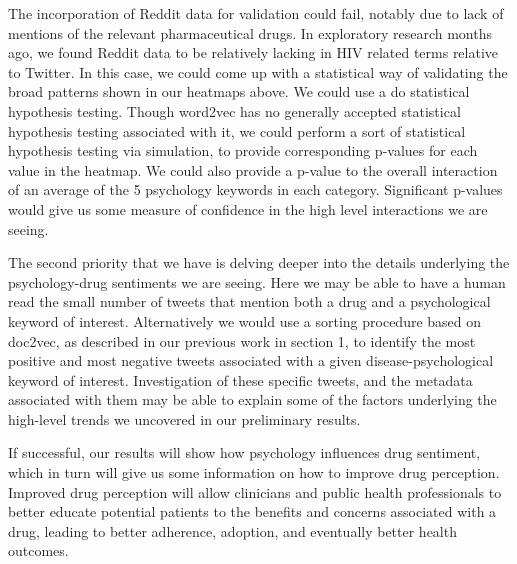 The incorporation of Reddit data for validation could fail, notably due to lack of mentions of the relevant pharmaceutical drugs. In exploratory research months ago, we found Reddit data to be relatively lacking in HIV related terms relative to Twitter. In this case, we could come up with a statistical way of validating the broad patterns shown in our heatmaps above. We could use a do statistical hypothesis testing. Though word2vec has no generally accepted statistical hypothesis testing associated with it, we could perform a sort of statistical hypothesis testing via simulation, to provide corresponding p-values for each value in the heatmap. We could also provide a p-value to the overall interaction of an average of the 5 psychology keywords in each category. Significant p-values would give us some measure of confidence in the high level interactions we are seeing.

The second priority that we have is delving deeper into the details underlying the psychology-drug sentiments we are seeing. Here we may be able to have a human read the small number of tweets that mention both a drug and a psychological keyword of interest. Alternatively we would use a sorting procedure based on doc2vec, as described in our previous work in section 1, to identify the most positive and most negative tweets associated with a given disease-psychological keyword of interest. Investigation of these specific tweets, and the metadata associated with them may be able to explain some of the factors underlying the high-level trends we uncovered in our preliminary results.

If successful, our results will show how psychology influences drug sentiment, which in turn will give us some information on how to improve drug perception. Improved drug perception will allow clinicians and public health professionals to better educate potential patients to the benefits and concerns associated with a drug, leading to better adherence, adoption, and eventually better health outcomes.

